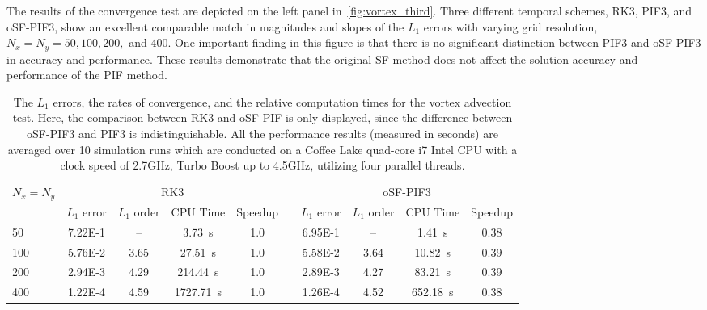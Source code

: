 The results of the convergence test are depicted on the left panel in~\cref{fig:vortex_third}.
Three different temporal schemes, RK3, PIF3, and oSF-PIF3, show an excellent comparable match in
magnitudes and slopes of the \( L_{1} \) errors with varying grid resolution, \( N_{x} = N_{y} = 50, 100, 200, \) and \( 400 \).
One important finding in this figure is that there is no significant distinction
between PIF3 and oSF-PIF3 in accuracy and performance.
These results demonstrate that the original SF method
does not affect the solution accuracy and performance of the PIF method.

\begin{table}
    \centering
    \caption{The \( L_{1} \) errors, the rates of convergence,
        and the relative computation times for the vortex advection test.
        Here, the comparison between RK3 and oSF-PIF is only displayed,
        since the difference between oSF-PIF3 and PIF3 is indistinguishable.
        All the performance results (measured in seconds) are averaged
        over 10 simulation runs which are conducted on
        a Coffee Lake quad-core i7 Intel CPU with a
        clock speed of 2.7GHz, Turbo Boost up to 4.5GHz,
        utilizing four parallel threads.
    }\label{table:vortex_weno_third}
    \begin{adjustbox}{width=\textwidth}
        \begin{tabular}{@{}lcccclcccc@{}}
            \toprule
            \multirow{2}{*}{\( N_{x} = N_{y} \)} & \multicolumn{4}{c}{RK3} &  & \multicolumn{4}{c}{oSF-PIF3} \\
            \cmidrule(lr){2-5} \cmidrule(l){7-10}
            & \(L_{1}\) error & \(L_{1}\) order & CPU Time & Speedup &  &
            \(L_{1}\) error & \(L_{1}\) order & CPU Time & Speedup \\ \midrule
            50  & \num{7.22E-1} & \--- & \SI{3.73}{\second}    & 1.0 &  & \num{6.95E-1} & \--- & \SI{1.41}{\second} & 0.38 \\
            100 & \num{5.76E-2} & 3.65 & \SI{27.51}{\second}   & 1.0 &  & \num{5.58E-2} & 3.64 & \SI{10.82}{\second} & 0.39 \\
            200 & \num{2.94E-3} & 4.29 & \SI{214.44}{\second}  & 1.0 &  & \num{2.89E-3} & 4.27 & \SI{83.21}{\second} & 0.39 \\
            400 & \num{1.22E-4} & 4.59 & \SI{1727.71}{\second} & 1.0 &  & \num{1.26E-4} & 4.52 & \SI{652.18}{\second} & 0.38
        \end{tabular}
    \end{adjustbox}
\end{table}

